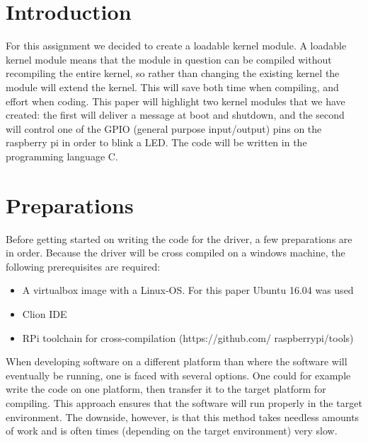 \documentclass[
10pt, %
a4paper, %
oneside, %
headinclude,footinclude, %
BCOR5mm, %
]{scrartcl}
\begin{document}

\section{Introduction}

For this assignment we decided to create a loadable kernel module. A loadable kernel module means that the module in question can be compiled without recompiling the entire kernel, so rather than changing the existing kernel the module will extend the kernel. This will save both time when compiling, and effort when coding. This paper will highlight two kernel modules that we have created: the first will deliver a message at boot and shutdown, and the second will control one of the GPIO (general purpose input/output) pins on the raspberry pi in order to blink a LED. The code will be written in the programming language C.
 

\section{Preparations}

Before getting started on writing the code for the driver, a few preparations are in order. Because the driver will be cross compiled on a windows machine, the following prerequisites are required:

\begin{itemize}
	\item A virtualbox image with a Linux-OS. For this paper Ubuntu 16.04 was used
	\item Clion IDE
	\item RPi toolchain for cross-compilation (https://github.com/
raspberrypi/tools)
\end{itemize}

When developing software on a different platform than where the software will eventually be running, one is faced with several options. One could for example write the code on one platform, then transfer it to the target platform for compiling. This approach ensures that the software will run properly in the target environment. The downside, however, is that this method takes needless amounts of work and is often times (depending on the target environment) very slow.
\end{document}
